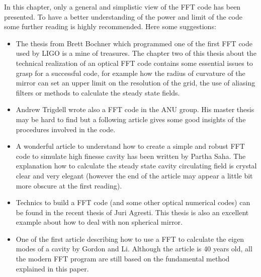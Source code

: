 In this chapter, only a general and simplistic view of the FFT code has been presented. To have a better understanding of the power and limit of the code some further reading is highly recommended. Here some suggestions:
\begin{itemize}
  \item The thesis from Brett Bochner\cite{Bochner} which programmed one of the first FFT code used by LIGO is a mine of treasures. The chapter two of this thesis about the technical realization of an optical FFT code contains some essential issues to grasp for a successful code, for example how the radius of curvature of the mirror can set an upper limit on the resolution of the grid, the use of aliasing filters or methods to calculate the steady state fields.

  \item Andrew Trigdell wrote also a FFT code in the ANU group. His master thesis may be hard to find but a following article\cite{Tridgell} gives some good insights of the procedures involved in the code.

  \item A wonderful article to understand how to create a simple and robust FFT code to simulate high finesse cavity has been written by Partha Saha. The explanation how to calculate the steady state cavity circulating field is crystal clear and very elegant (however the end of the article may appear a little bit more obscure at the first reading).

  \item Technics to build a FFT code (and some other optical numerical codes) can be found in the recent thesis of Juri Agresti\cite{Juri}. This thesis is also an excellent example about how to deal with non spherical mirror.

 \item One of the first article describing how to use a FFT to calculate the eigen modes of a cavity by Gordon and Li\cite{Gordon}. Although the article is 40 years old, all the modern FFT program are still based on the fundamental method explained in this paper.

\end{itemize}







